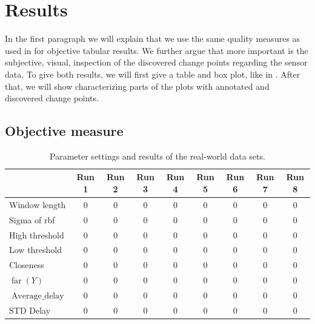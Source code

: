 \section{Results}\label{sec:real_world_results}


In the first paragraph we will explain that we use the same quality measures as used in  for objective tabular results.
We further argue that more important is the subjective, visual, inspection of the discovered change points regarding the sensor data.
To give both results, we will first give a table and box plot, like in .
After that, we will show characterizing parts of the plots with annotated and discovered change points.

\subsection{Objective measure}


\begin{table}
  \centering
  \begin{tabulary}{\textwidth}{|l|c|c|c|c|c|c|c|c|}
     & Run 1 & Run 2 & Run 3 & Run 4 & Run 5 & Run 6 & Run 7 & Run 8 \\
    \hline
    Window length & 0 & 0 & 0 & 0 & 0 & 0 & 0 & 0 \\
    \hline
    Sigma of \gls{rbf} & 0 & 0 & 0 & 0 & 0 & 0 & 0 & 0 \\
    \hline
    High threshold & 0 & 0 & 0 & 0 & 0 & 0 & 0 & 0 \\
    \hline
    Low threshold & 0 & 0 & 0 & 0 & 0 & 0 & 0 & 0 \\
    \hline
    Closeness & 0 & 0 & 0 & 0 & 0 & 0 & 0 & 0 \\
    \hline
    \hline
    $\operatorname*{far}(Y)$ & 0 & 0 & 0 & 0 & 0 & 0 & 0 & 0 \\
    \hline
    $\operatorname*{Average\_delay}$ & 0 & 0 & 0 & 0 & 0 & 0 & 0 & 0 \\
    \hline
    STD Delay & 0 & 0 & 0 & 0 & 0 & 0 & 0 & 0 \\
    \hline
  \end{tabulary}
  \caption[Results real world runs]{Parameter settings and results of the real-world data sets.}
  \label{tab:results_real_world}
\end{table}


